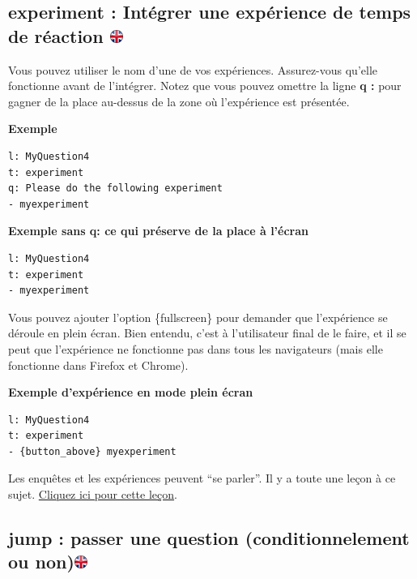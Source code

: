 \documentclass[
]{book}
\begin{document}
\hypertarget{experiment-intuxe9grer-une-expuxe9rience-de-temps-de-ruxe9action}{%
\subsection[experiment : Intégrer une expérience de temps de réaction ]{\texorpdfstring{experiment : Intégrer une expérience de temps de réaction \href{https://www.psytoolkit.org/doc3.4.0/online-survey-syntax.html\#experiment}{\protect\includegraphics{img/ukflag.png}}}{experiment : Intégrer une expérience de temps de réaction }}\label{experiment-intuxe9grer-une-expuxe9rience-de-temps-de-ruxe9action}}

Vous pouvez utiliser le nom d'une de vos expériences. Assurez-vous qu'elle fonctionne avant de l'intégrer. Notez que vous pouvez omettre la ligne \textbf{q :} pour gagner de la place au-dessus de la zone où l'expérience est présentée.

\textbf{Exemple}

\begin{verbatim}
l: MyQuestion4
t: experiment
q: Please do the following experiment
- myexperiment
\end{verbatim}

\textbf{Exemple sans q: ce qui préserve de la place à l'écran}

\begin{verbatim}
l: MyQuestion4
t: experiment
- myexperiment
\end{verbatim}

Vous pouvez ajouter l'option \{fullscreen\} pour demander que l'expérience se déroule en plein écran. Bien entendu, c'est à l'utilisateur final de le faire, et il se peut que l'expérience ne fonctionne pas dans tous les navigateurs (mais elle fonctionne dans Firefox et Chrome).

\textbf{Exemple d'expérience en mode plein écran}

\begin{verbatim}
l: MyQuestion4
t: experiment
- {button_above} myexperiment
\end{verbatim}

Les enquêtes et les expériences peuvent ``se parler''. Il y a toute une leçon à ce sujet. \protect\hyperlink{s11}{Cliquez ici pour cette leçon}.

\hypertarget{jump-passer-une-question-conditionnelement-ou-non}{%
\subsection[jump : passer une question (conditionnelement ou non)]{\texorpdfstring{jump : passer une question (conditionnelement ou non)\href{https://www.psytoolkit.org/doc3.4.0/online-survey-syntax.html\#jump}{\protect\includegraphics{img/ukflag.png}}}{jump : passer une question (conditionnelement ou non)}}\label{jump-passer-une-question-conditionnelement-ou-non}}
\end{document}
